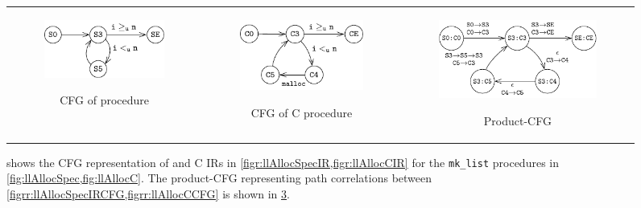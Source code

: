 \begin{figure}[t!]
\begin{tabular}{@{}c@{}c@{}c@{}}
\begin{subfigure}[b]{0.30\textwidth}
\begin{center}
{\includegraphics[scale=1.15]{chapters/figures/figMallocSpecCfg.pdf}}
\end{center}
\vspace{17px}
\caption{\label{figrr:llAllocSpecIRCFG}CFG of \SpecL{} procedure}
\end{subfigure}%
&
\begin{subfigure}[b]{0.30\textwidth}
\begin{center}
{\includegraphics[scale=1.1]{chapters/figures/figMallocCCfg.pdf}}
\end{center}
\vspace{5px}
\caption{\label{figrr:llAllocCCFG}CFG of C procedure}
\end{subfigure}%
&
\begin{subfigure}[b]{0.40\textwidth}
\begin{center}
{\includegraphics[scale=1.1]{chapters/figures/figMallocProductCfg.pdf}}
\end{center}
\caption{\label{figrr:llAllocProductCFG}Product-CFG}
\end{subfigure}%
\\
\end{tabular}
\caption{\label{figrr:llAllocAllCFGs} shows the CFG representation of \SpecL{} and C IRs in \cref{figr:llAllocSpecIR,figr:llAllocCIR}
for the {\tt mk\_list} procedures in \cref{fig:llAllocSpec,fig:llAllocC}.
The product-CFG representing path correlations between \cref{figrr:llAllocSpecIRCFG,figrr:llAllocCCFG} is shown in \cref{figrr:llAllocProductCFG}.}
\end{figure}